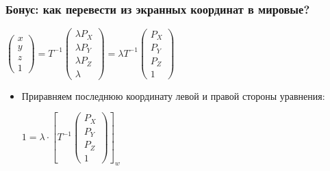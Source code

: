 \documentclass[10pt]{beamer}
\begin{document}
\begin{frame}[fragile]
\frametitle{Бонус: как перевести из экранных координат в мировые?}
\begin{center}
\begin{math}
\begin{pmatrix}x \\ y \\ z \\ 1\end{pmatrix} = T^{-1} \begin{pmatrix}\lambda P_X \\ \lambda P_Y \\ \lambda P_Z \\ \lambda\end{pmatrix} = \lambda T^{-1} \begin{pmatrix}P_X \\ P_Y \\ P_Z \\ 1\end{pmatrix}
\end{math}
\end{center}
\pause
\begin{itemize}
\item Приравняем последнюю координату левой и правой стороны уравнения:
\begin{center}
\begin{math}
1 = \lambda \cdot
\left[
T^{-1} \begin{pmatrix}P_X \\ P_Y \\ P_Z \\ 1\end{pmatrix}
\right]_w
\end{math}
\end{center}
\end{itemize}
\end{frame}
\end{document}
